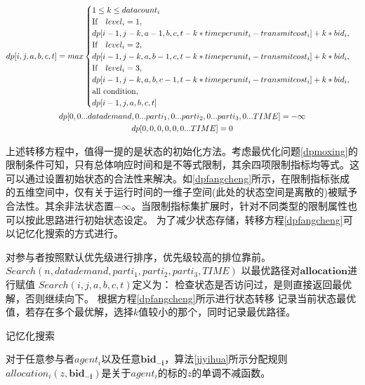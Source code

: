 \documentclass[promaster]{thesis-uestc}
\begin{document}
\begin{gather}
\label{dpfangcheng}  
dp[i,j,a,b,c,t] = max
\begin{cases}
1 \leq k \leq datacount_i \\
\text{If} \quad level_i = 1,\\
dp[i-1,j-k,a-1,b,c,t-k*timeperunit_i-transmitcost_i]+ k*bid_i,\\
\text{If}\quad level_i = 2,\\
dp[i-1,j-k,a,b-1,c,t-k*timeperunit_i-transmitcost_i]+ k*bid_i,\\
\text{If} \quad level_i = 3,\\
dp[i-1,j-k,a,b,c-1,t-k*timeperunit_i-transmitcost_i]+ k*bid_i,\\
\text{all condition},\\
dp[i-1,j,a,b,c,t]
\end{cases}\\
dp[0,0...datademand,0...parti_1,0...parti_2,0...parti_3,0...TIME] =-\infty \notag\\
dp[0,0,0,0,0,0...TIME] = 0 \notag
\end{gather}

上述转移方程中，值得一提的是状态的初始化方法。考虑最优化问题\ref{dpmoxing}的限制条件可知，只有总体响应时间和是不等式限制，其余四项限制指标均等式。这可以通过设置初始状态的合法性来解决。如\ref{dpfangcheng}所示，在限制指标张成的五维空间中，仅有关于运行时间的一维子空间(此处的状态空间是离散的)被赋予合法性。其余非法状态置$-\infty$。当限制指标集扩展时，针对不同类型的限制属性也可以按此思路进行初始状态设定。
为了减少状态存储，转移方程\ref{dpfangcheng}可以记忆化搜索的方式进行。

\begin{algorithm}[H]
    对参与者按照默认优先级进行排序，优先级较高的排位靠前。
    $Search(n,datademand,parti_1,parti_2,parti_3,TIME)$\;
    以最优路径对$\mathbf{allocation}$进行赋值\;
    \;
    $Search(i,j,a,b,c,t)$定义为：\;
    检查状态是否访问过，是则直接返回最优解，否则继续向下。\;
    根据方程\ref{dpfangcheng}所示进行状态转移\;
    记录当前状态最优值，若存在多个最优解，选择$k$值较小的那个，同时记录最优路径。\;
\caption{记忆化搜索}
\label{jiyihua}
\end{algorithm}

\begin{theorem}
对于任意参与者$agent_i$以及任意$\mathbf{bid_{-i}}$，算法\ref{jiyihua}所示分配规则$allocation_i(z,\mathbf{bid_{-i}})$是关于$agent_i$的标的$z$的单调不减函数。
\end{theorem}
\end{document}
